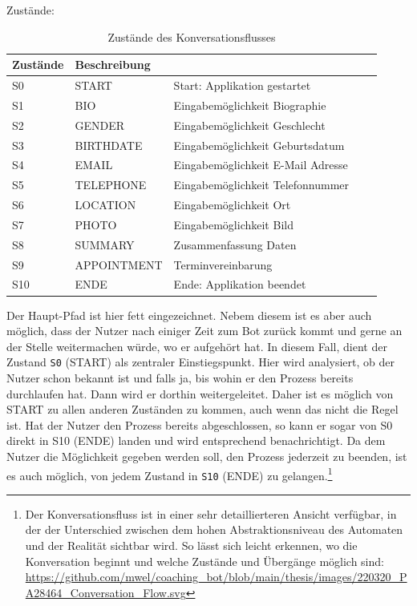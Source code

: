 	Zustände:
	\begin{table} %
		\centering
		\begin{tabular}{l | l l l l}
			\textbf{Zustände} 	& \textbf{Beschreibung}\\
			\hline
			S0 					&		 START 			&		 Start: Applikation gestartet\\
			S1 					&		 BIO 			&		 Eingabemöglichkeit Biographie\\
			S2 					&		 GENDER 		&		 Eingabemöglichkeit Geschlecht\\
			S3 					&		 BIRTHDATE 		&		 Eingabemöglichkeit Geburtsdatum\\
			S4 					&		 EMAIL 			&		 Eingabemöglichkeit E-Mail Adresse\\
			S5 					&		 TELEPHONE 		&		 Eingabemöglichkeit Telefonnummer\\
			S6 					&		 LOCATION 		&		 Eingabemöglichkeit Ort\\
			S7 					&		 PHOTO 			&		 Eingabemöglichkeit Bild\\
			S8 					&		 SUMMARY 		&		 Zusammenfassung Daten\\
			S9 					&		 APPOINTMENT	&		 Terminvereinbarung \\
			S10 				&		 ENDE 			&		 Ende: Applikation beendet\\

		\end{tabular}
		\caption{Zustände des Konversationsflusses}
		\label{tab: states}
	\end{table}

	Der Haupt-Pfad ist hier fett eingezeichnet. Nebem diesem ist es aber auch möglich, dass der Nutzer nach einiger Zeit zum Bot zurück kommt und gerne an der Stelle weitermachen würde, wo er aufgehört hat. In diesem Fall, dient der Zustand \verb|S0| (START) als zentraler Einstiegspunkt. Hier wird analysiert, ob der Nutzer schon bekannt ist und falls ja, bis wohin er den Prozess bereits durchlaufen hat. Dann wird er dorthin weitergeleitet. Daher ist es möglich von START zu allen anderen Zuständen zu kommen, auch wenn das nicht die Regel ist. Hat der Nutzer den Prozess bereits abgeschlossen, so kann er sogar von S0 direkt in S10 (ENDE) landen und wird entsprechend benachrichtigt. Da dem Nutzer die Möglichkeit gegeben werden soll, den Prozess jederzeit zu beenden, ist es auch möglich, von jedem Zustand in \verb|S10| (ENDE) zu gelangen.\footnote{Der Konversationsfluss ist in einer sehr detaillierteren Ansicht verfügbar, in der der Unterschied zwischen dem hohen Abstraktionsniveau des Automaten und der Realität sichtbar wird. So lässt sich leicht erkennen, wo die Konversation beginnt und welche Zustände und Übergänge möglich sind: \url{https://github.com/mwel/coaching_bot/blob/main/thesis/images/220320_PA28464_Conversation_Flow.svg}} 
